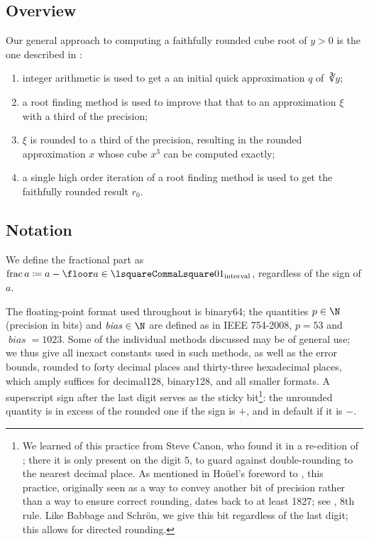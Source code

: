 ﻿\documentclass[10pt, a4paper, twoside]{basestyle}
\DeclareMathOperator{\bias}{\mathit{bias}}
\begin{document}
\subsection*{Overview}
Our general approach to computing a faithfully rounded cube root of $y>0$ is the one described in \cite{KahanBindel2001}:
\begin{enumerate}
\item integer arithmetic is used to get a an initial quick approximation $q$ of $\cuberoot y$;
\item a root finding method is used to improve that that to an approximation $ξ$ with a third of the precision;
\item $ξ$ is rounded to a third of the precision, resulting in the rounded approximation $x$ whose cube $x^3$ can be computed exactly;
\item a single high order iteration of a root finding method is used to get the faithfully rounded result $r_0$.
\end{enumerate} 

\subsection*{Notation}
We define the fractional part as $\FractionalPart a\DefineAs a-\Floor a\in\intclop{0}{1}$, regardless of the sign of $a$.

The floating-point format used throughout is binary64; the quantities $p\in\N$ (precision in bits) and $\bias\in\N$ are 
defined as in IEEE 754-2008, $p=53$ and $\bias=1023$.
Some of the individual methods discussed may be of general use; we thus give all inexact constants used in such methods, as well as the error bounds, rounded to forty decimal places and thirty-three
hexadecimal places, which amply suffices for decimal128, binary128, and all smaller formats. A
superscript sign after the last digit serves as the sticky bit\footnote{We learned of this practice
from Steve Canon, who found it in a re-edition of \cite[VIII]{Bruhns1870}; there it is only present
on the digit $5$, to guard against double-rounding to the nearest decimal place.
As mentioned in Hoüel's foreword to \cite[II]{Schrön1873}, this practice, originally seen as a way to
convey another bit of precision rather than a way to ensure correct rounding, dates back to at least
1827; see \cite[X]{Babbage1827}, 8th rule. Like Babbage and Schrön, we give this bit regardless of
the last digit; this allows for directed rounding.}:
the unrounded quantity is in excess of the rounded one if the sign is $+$,
and in default if it is $-$.
\end{document}
